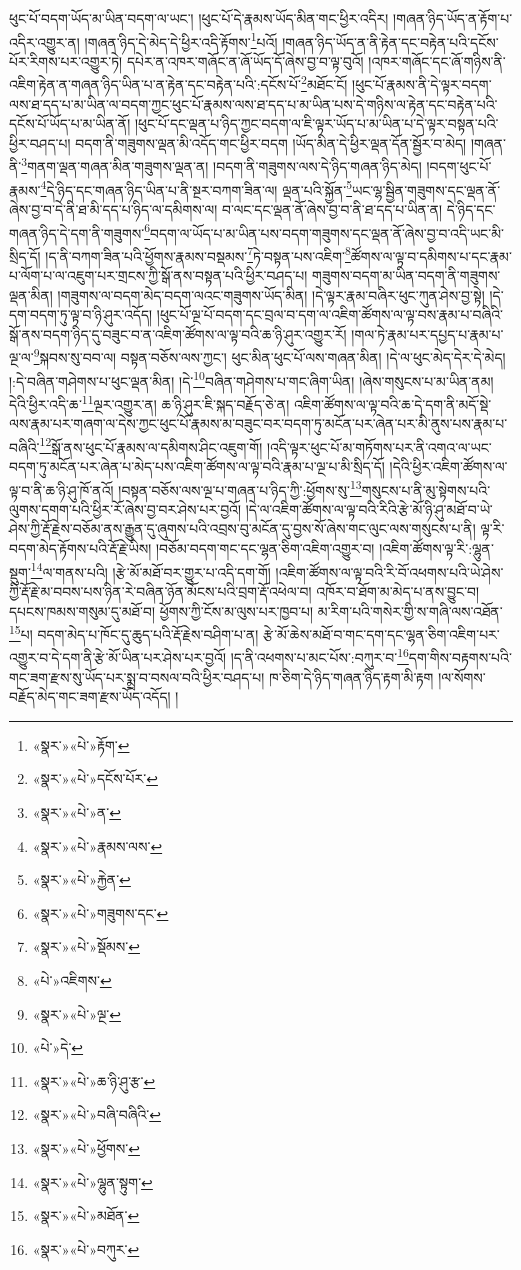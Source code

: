 ཕུང་པོ་བདག་ཡོད་མ་ཡིན་བདག་ལ་ཡང་། །ཕུང་པོ་དེ་རྣམས་ཡོད་མིན་གང་ཕྱིར་འདིར། །གཞན་ཉིད་ཡོད་ན་རྟོག་པ་འདིར་འགྱུར་ན། །གཞན་ཉིད་དེ་མེད་དེ་ཕྱིར་འདི་རྟོགས་\footnote{«སྣར་»«པེ་»རྟོག་}པའོ། །གཞན་ཉིད་ཡོད་ན་ནི་རྟེན་དང་བརྟེན་པའི་དངོས་པོར་རིགས་པར་འགྱུར་ཏེ། དཔེར་ན་འཁར་གཞོང་ན་ཞོ་ཡོད་དོ་ཞེས་བྱ་བ་ལྟ་བུའོ། །འཁར་གཞོང་དང་ཞོ་གཉིས་ནི་འཇིག་རྟེན་ན་གཞན་ཉིད་ཡིན་པ་ན་རྟེན་དང་བརྟེན་པའི་:དངོས་པོ་\footnote{«སྣར་»«པེ་»དངོས་པོར་}མཐོང་ངོ། །ཕུང་པོ་རྣམས་ནི་དེ་ལྟར་བདག་ལས་ཐ་དད་པ་མ་ཡིན་ལ་བདག་ཀྱང་ཕུང་པོ་རྣམས་ལས་ཐ་དད་པ་མ་ཡིན་པས་དེ་གཉིས་ལ་རྟེན་དང་བརྟེན་པའི་དངོས་པོ་ཡོད་པ་མ་ཡིན་ནོ། །ཕུང་པོ་དང་ལྡན་པ་ཉིད་ཀྱང་བདག་ལ་ཇི་ལྟར་ཡོད་པ་མ་ཡིན་པ་དེ་ལྟར་བསྟན་པའི་ཕྱིར་བཤད་པ། བདག་ནི་གཟུགས་ལྡན་མི་འདོད་གང་ཕྱིར་བདག །ཡོད་མིན་དེ་ཕྱིར་ལྡན་དོན་སྦྱོར་བ་མེད། །གཞན་ནི་\footnote{«སྣར་»«པེ་»ན་}གནག་ལྡན་གཞན་མིན་གཟུགས་ལྡན་ན། །བདག་ནི་གཟུགས་ལས་དེ་ཉིད་གཞན་ཉིད་མེད། །བདག་ཕུང་པོ་རྣམས་\footnote{«སྣར་»«པེ་»རྣམས་ལས་}དེ་ཉིད་དང་གཞན་ཉིད་ཡིན་པ་ནི་སྔར་བཀག་ཟིན་ལ། ལྡན་པའི་སྐྱོན་\footnote{«སྣར་»«པེ་»རྐྱེན་}ཡང་ལྷ་སྦྱིན་གཟུགས་དང་ལྡན་ནོ་ཞེས་བྱ་བ་དེ་ནི་ཐ་མི་དད་པ་ཉིད་ལ་དམིགས་ལ། བ་ལང་དང་ལྡན་ནོ་ཞེས་བྱ་བ་ནི་ཐ་དད་པ་ཡིན་ན། དེ་ཉིད་དང་གཞན་ཉིད་དེ་དག་ནི་གཟུགས་\footnote{«སྣར་»«པེ་»གཟུགས་དང་}བདག་ལ་ཡོད་པ་མ་ཡིན་པས་བདག་གཟུགས་དང་ལྡན་ནོ་ཞེས་བྱ་བ་འདི་ཡང་མི་སྲིད་དོ། །ད་ནི་བཀག་ཟིན་པའི་ཕྱོགས་རྣམས་བསྡམས་\footnote{«སྣར་»«པེ་»སྡོམས་}ཏེ་བསྟན་པས་འཇིག་\footnote{«པེ་»འཇིགས་}ཚོགས་ལ་ལྟ་བ་དམིགས་པ་དང་རྣམ་པ་ལོག་པ་ལ་འཇུག་པར་གྲངས་ཀྱི་སྒོ་ནས་བསྟན་པའི་ཕྱིར་བཤད་པ། གཟུགས་བདག་མ་ཡིན་བདག་ནི་གཟུགས་ལྡན་མིན། །གཟུགས་ལ་བདག་མེད་བདག་ལའང་གཟུགས་ཡོད་མིན། །དེ་ལྟར་རྣམ་བཞིར་ཕུང་ཀུན་ཤེས་བྱ་སྟེ། །དེ་དག་བདག་ཏུ་ལྟ་བ་ཉི་ཤུར་འདོད། །ཕུང་པོ་ལྔ་པོ་བདག་དང་བྲལ་བ་དག་ལ་འཇིག་ཚོགས་ལ་ལྟ་བས་རྣམ་པ་བཞིའི་སྒོ་ནས་བདག་ཉིད་དུ་བཟུང་བ་ན་འཇིག་ཚོགས་ལ་ལྟ་བའི་ཆ་ཉི་ཤུར་འགྱུར་རོ། །གལ་ཏེ་རྣམ་པར་དཔྱད་པ་རྣམ་པ་ལྔ་ལ་\footnote{«སྣར་»«པེ་»ལྔ་}སྐབས་སུ་བབ་ལ། བསྟན་བཅོས་ལས་ཀྱང་། ཕུང་མིན་ཕུང་པོ་ལས་གཞན་མིན། །དེ་ལ་ཕུང་མེད་དེར་དེ་མེད། །:དེ་བཞིན་གཤེགས་པ་ཕུང་ལྡན་མིན། །དེ་\footnote{«པེ་»དེ་}བཞིན་གཤེགས་པ་གང་ཞིག་ཡིན། །ཞེས་གསུངས་པ་མ་ཡིན་ནམ། དེའི་ཕྱིར་འདི་ཆ་\footnote{«སྣར་»«པེ་»ཆ་ཉི་ཤུ་རྩ་}ལྔར་འགྱུར་ན། ཆ་ཉི་ཤུར་ཇི་སྐད་བརྗོད་ཅེ་ན། འཇིག་ཚོགས་ལ་ལྟ་བའི་ཆ་དེ་དག་ནི་མདོ་སྡེ་ལས་རྣམ་པར་གཞག་ལ་དེས་ཀྱང་ཕུང་པོ་རྣམས་མ་བཟུང་བར་བདག་ཏུ་མངོན་པར་ཞེན་པར་མི་ནུས་པས་རྣམ་པ་བཞིའི་\footnote{«སྣར་»«པེ་»བཞི་བཞིའི་}སྒོ་ནས་ཕུང་པོ་རྣམས་ལ་དམིགས་ཤིང་འཇུག་གོ། །འདི་ལྟར་ཕུང་པོ་མ་གཏོགས་པར་ནི་འགའ་ལ་ཡང་བདག་ཏུ་མངོན་པར་ཞེན་པ་མེད་པས་འཇིག་ཚོགས་ལ་ལྟ་བའི་རྣམ་པ་ལྔ་པ་མི་སྲིད་དོ། །དེའི་ཕྱིར་འཇིག་ཚོགས་ལ་ལྟ་བ་ནི་ཆ་ཉི་ཤུ་ཁོ་ནའོ། །བསྟན་བཅོས་ལས་ལྔ་པ་གཞན་པ་ཉིད་ཀྱི་:ཕྱོགས་སུ་\footnote{«སྣར་»«པེ་»ཕྱོགས་}གསུངས་པ་ནི་མུ་སྟེགས་པའི་ལུགས་དགག་པའི་ཕྱིར་རོ་ཞེས་བྱ་བར་ཤེས་པར་བྱའོ། །དེ་ལ་འཇིག་ཚོགས་ལ་ལྟ་བའི་རིའི་རྩེ་མོ་ཉི་ཤུ་མཐོ་བ་ཡེ་ཤེས་ཀྱི་རྡོ་རྗེས་བཅོམ་ནས་རྒྱུན་དུ་ཞུགས་པའི་འབྲས་བུ་མངོན་དུ་བྱས་སོ་ཞེས་གང་ལུང་ལས་གསུངས་པ་ནི། ལྟ་རི་བདག་མེད་རྟོགས་པའི་རྡོ་རྗེ་ཡིས། །བཅོམ་བདག་གང་དང་ལྷན་ཅིག་འཇིག་འགྱུར་བ། །འཇིག་ཚོགས་ལྟ་རི་:ལྷུན་སྡུག་\footnote{«སྣར་»«པེ་»ལྷུན་སྟུག་}ལ་གནས་པའི། །རྩེ་མོ་མཐོ་བར་གྱུར་པ་འདི་དག་གོ། །འཇིག་ཚོགས་ལ་ལྟ་བའི་རི་བོ་འཕགས་པའི་ཡེ་ཤེས་ཀྱི་རྡོ་རྗེ་མ་བབས་པས་ཉིན་རེ་བཞིན་ཉོན་མོངས་པའི་བྲག་རྡོ་འཕེལ་བ། འཁོར་བ་ཐོག་མ་མེད་པ་ནས་བྱུང་བ། དཔངས་ཁམས་གསུམ་དུ་མཐོ་བ། ཕྱོགས་ཀྱི་ངོས་མ་ལུས་པར་ཁྱབ་པ། མ་རིག་པའི་གསེར་གྱི་ས་གཞི་ལས་འཐོན་\footnote{«སྣར་»«པེ་»མཐོན་}པ། བདག་མེད་པ་ཁོང་དུ་ཆུད་པའི་རྡོ་རྗེས་བཤིག་པ་ན། རྩེ་མོ་ཆེས་མཐོ་བ་གང་དག་དང་ལྷན་ཅིག་འཇིག་པར་འགྱུར་བ་དེ་དག་ནི་རྩེ་མོ་ཡིན་པར་ཤེས་པར་བྱའོ། །ད་ནི་འཕགས་པ་མང་པོས་:བཀུར་བ་\footnote{«སྣར་»«པེ་»བཀུར་}དག་གིས་བརྟགས་པའི་གང་ཟག་རྫས་སུ་ཡོད་པར་སྨྲ་བ་བསལ་བའི་ཕྱིར་བཤད་པ། ཁ་ཅིག་དེ་ཉིད་གཞན་ཉིད་རྟག་མི་རྟག །ལ་སོགས་བརྗོད་མེད་གང་ཟག་རྫས་ཡོད་འདོད། །

